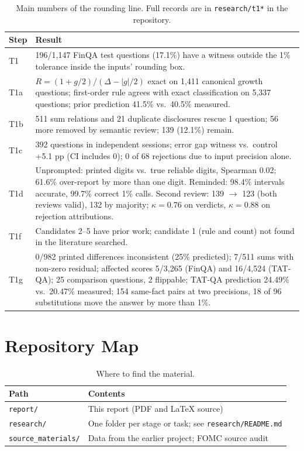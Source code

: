 \documentclass[11pt]{article}
\begin{document}
\begin{table}[H]
\centering
\scriptsize
\renewcommand{\arraystretch}{1.12}
\begin{tabular}{@{}L{1.1cm}L{5.7cm}@{}}
\toprule
\textbf{Step} & \textbf{Result} \\
\midrule
T1 & 196/1,147 FinQA test questions (17.1\%) have a witness outside the 1\% tolerance inside the inputs' rounding box. \\
T1a & $R=(1+g/2)/(\Delta-|g|/2)$ exact on 1,411 canonical growth questions; first-order rule agrees with exact classification on 5,337 questions; prior prediction 41.5\% vs.\ 40.5\% measured. \\
T1b & 511 sum relations and 21 duplicate disclosures rescue 1 question; 56 more removed by semantic review; 139 (12.1\%) remain. \\
T1c & 392 questions in independent sessions; error gap witness vs.\ control +5.1 pp (CI includes 0); 0 of 68 rejections due to input precision alone. \\
T1d & Unprompted: printed digits vs.\ true reliable digits, Spearman 0.02; 61.6\% over-report by more than one digit. Reminded: 98.4\% intervals accurate, 99.7\% correct 1\% calls. Second review: 139 $\to$ 123 (both reviews valid), 132 by majority; $\kappa=0.76$ on verdicts, $\kappa=0.88$ on rejection attributions. \\
T1f & Candidates 2--5 have prior work; candidate 1 (rule and count) not found in the literature searched. \\
T1g & 0/982 printed differences inconsistent (25\% predicted); 7/511 sums with non-zero residual; affected scores 5/3,265 (FinQA) and 16/4,524 (TAT-QA); 25 comparison questions, 2 flippable; TAT-QA prediction 24.49\% vs.\ 20.47\% measured; 154 same-fact pairs at two precisions, 18 of 96 substitutions move the answer by more than 1\%. \\
\bottomrule
\end{tabular}
\caption{Main numbers of the rounding line. Full records are in \texttt{research/t1*} in the repository.}
\end{table}

\section{Repository Map}
\label{app:repo}

\begin{table}[H]
\centering
\scriptsize
\begin{tabular}{@{}L{2.4cm}L{4.4cm}@{}}
\toprule
\textbf{Path} & \textbf{Contents} \\
\midrule
\texttt{report/} & This report (PDF and LaTeX source) \\
\texttt{research/} & One folder per stage or task; see \texttt{research/README.md} \\
\texttt{source\_materials/} & Data from the earlier project; FOMC source audit \\
\bottomrule
\end{tabular}
\caption{Where to find the material.}
\end{table}
\end{document}
